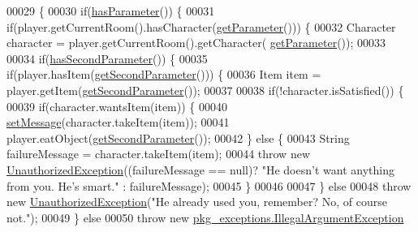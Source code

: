 \begin{DoxyCode}
00029                                                                                                            
                              \{
00030         \textcolor{keywordflow}{if}(\hyperlink{classpkg__commands_1_1Command_a02af95ab3f1898a66259ab7c177b6998}{hasParameter}()) \{
00031             \textcolor{keywordflow}{if}(player.getCurrentRoom().hasCharacter(\hyperlink{classpkg__commands_1_1Command_a41c92d445be73ea9d62320c65efb8434}{getParameter}())) \{
00032                 Character character = player.getCurrentRoom().getCharacter(
      \hyperlink{classpkg__commands_1_1Command_a41c92d445be73ea9d62320c65efb8434}{getParameter}());
00033 
00034                 \textcolor{keywordflow}{if}(\hyperlink{classpkg__commands_1_1Command_add688a76d80576c34f23927da19b9e2d}{hasSecondParameter}()) \{
00035                     \textcolor{keywordflow}{if}(player.hasItem(\hyperlink{classpkg__commands_1_1Command_a20d3ebdc0683a87b43be2a92a1cad111}{getSecondParameter}())) \{
00036                         Item item = player.getItem(\hyperlink{classpkg__commands_1_1Command_a20d3ebdc0683a87b43be2a92a1cad111}{getSecondParameter}());
00037 
00038                         \textcolor{keywordflow}{if}(!character.isSatisfied()) \{
00039                             \textcolor{keywordflow}{if}(character.wantsItem(item)) \{
00040                                 \hyperlink{classpkg__commands_1_1Command_ae210ff216fe908b111ba1c988a963d13}{setMessage}(character.takeItem(item));
00041                                 player.eatObject(\hyperlink{classpkg__commands_1_1Command_a20d3ebdc0683a87b43be2a92a1cad111}{getSecondParameter}());
00042                             \} \textcolor{keywordflow}{else} \{
00043                                 String failureMessage = character.takeItem(item);
00044                                 \textcolor{keywordflow}{throw} \textcolor{keyword}{new} \hyperlink{classpkg__exceptions_1_1UnauthorizedException}{UnauthorizedException}((failureMessage == 
      null)? \textcolor{stringliteral}{"He doesn't want anything from you. He's smart."} : failureMessage);
00045                             \}
00046 
00047                         \} \textcolor{keywordflow}{else}
00048                             \textcolor{keywordflow}{throw} \textcolor{keyword}{new} \hyperlink{classpkg__exceptions_1_1UnauthorizedException}{UnauthorizedException}(\textcolor{stringliteral}{"He already used you,
       remember? No, of course not."});
00049                     \} \textcolor{keywordflow}{else}
00050                         \textcolor{keywordflow}{throw} \textcolor{keyword}{new} \hyperlink{classpkg__exceptions_1_1IllegalArgumentException}{pkg\_exceptions.IllegalArgumentException}

\end{DoxyCode}
